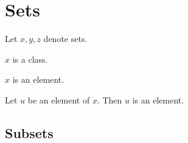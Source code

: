 \documentclass[../../sets-and-functions.ftl.tex]{subfiles}
\begin{document}
  \section{Sets}

  \begin{forthel}
  \end{forthel}

  \begin{forthel}
  \end{forthel}

  \begin{forthel}
    Let $x,y,z$ denote sets.
  \end{forthel}

  \begin{forthel}
    \begin{axiom}\label{SetTheory_01_01_729563}
      $x$ is a class.
    \end{axiom}

    \begin{axiom}\label{SetTheory_01_01_603161}
      $x$ is an element.
    \end{axiom}

    \begin{axiom}\label{SetTheory_01_01_617091}
      Let $u$ be an element of $x$.
      Then $u$ is an element.
    \end{axiom}
  \end{forthel}


  \subsection{Subsets}
\end{document}
